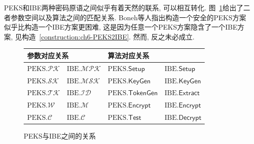 PEKS和IBE两种密码原语之间似乎有着天然的联系, 可以相互转化. 图~\ref{figure:ch6-PEKS-IBE}给出了二者参数空间以及算法之间的匹配关系. Boneh等人指出构造一个安全的PEKS方案似乎比构造一个IBE方案更困难, 这是因为任意一个PEKS方案隐含了一个IBE方案, 见构造~\ref{construction:ch6-PEKS2IBE}. 然而, 反之未必成立.
\begin{figure}[h]
\centering
\begin{tabular}{ll||ll}
\multicolumn{2}{l}{参数对应关系} & \multicolumn{2}{l}{算法对应关系}\\
\hline
\hline
$\text{PEKS}.\mathcal{PK}$ & $\text{IBE}.\mathcal{MPK}$  & $\text{PEKS}.\mathsf{Setup}$    & $\text{IBE}.\mathsf{Setup}$\\
$\text{PEKS}.\mathcal{SK}$ & $\text{IBE}.\mathcal{MSK}$  & $\text{PEKS}.\mathsf{KeyGen}$   & $\text{IBE}.\mathsf{KeyGen}$\\
$\text{PEKS}.\mathcal{TK}$ & $\text{IBE}.\mathcal{ID}$   & $\text{PEKS}.\mathsf{TokenGen}$ & $\text{IBE}.\mathsf{Extract}$\\
$\text{PEKS}.\mathcal{W}$  & $\text{IBE}.\mathcal{M}$    & $\text{PEKS}.\mathsf{Encrypt}$  & $\text{IBE}.\mathsf{Encrypt}$\\
$\text{PEKS}.\mathcal{C}$  & $\text{IBE}.\mathcal{C}$    & $\text{PEKS}.\mathsf{Test}$     & $\text{IBE}.\mathsf{Decrypt}$\\
\hline
\hline
\end{tabular}
\caption{PEKS与IBE之间的关系}\label{figure:ch6-PEKS-IBE}
\end{figure}
 
